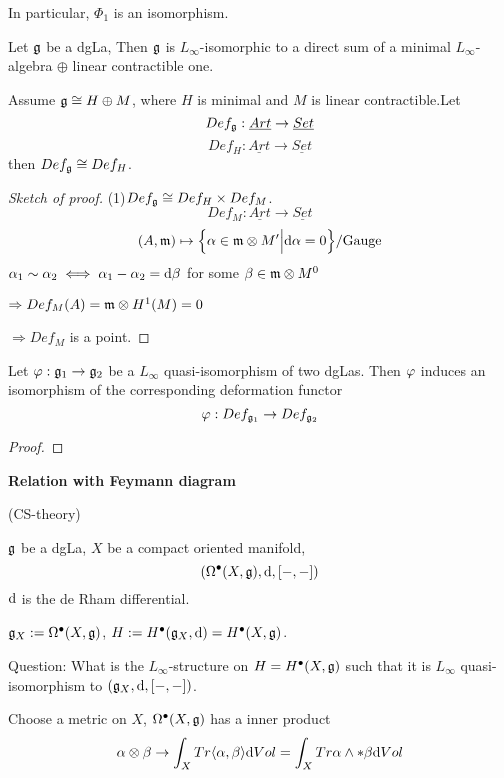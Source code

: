 In particular, $\Phi_1$ is an isomorphism.

\begin{prop}
Let $\mathfrak{g}$ be a dgLa, Then $\mathfrak{g}$ is $L_\infty$-isomorphic to
a direct sum of a minimal $L_\infty$-algebra $\oplus$
linear contractible one.
\end{prop}

\begin{cor}
Assume $\mathfrak{g}\cong H\oplus M$,
where $H$ is minimal and $M$ is linear contractible.Let
$$Def_{\mathfrak{g}}:\underline{Art}\to\underline{Set}$$
$$Def_H:\underline{Art}\to\underline{Set}$$
then $Def_{\mathfrak{g}}\cong Def_H$.
\end{cor}

\begin{proof}[Sketch of proof]
(1)$Def_{\mathfrak{g}}\cong Def_H\times Def_M$.
$$Def_M:\underline{Art}\to\underline{Set}$$
$$(A,\mathfrak{m})\mapsto\Big\{ \alpha\in\mathfrak{m}\otimes M' \Big| \mathrm{d}\alpha=0 \Big\}/\text{Gauge}$$
$\alpha_1\sim\alpha_2\iff \alpha_1-\alpha_2=\mathrm{d}\beta$ for some $\beta\in\mathfrak{m}\otimes M^0$

$\Rightarrow Def_M(A)=\mathfrak{m}\otimes H^1(M)=0$

$\Rightarrow Def_M$ is a point.
\end{proof}

\begin{prop}
Let $\varphi:\mathfrak{g}_1\to\mathfrak{g}_2$ be a $L_\infty$ quasi-isomorphism of two dgLas.
Then $\varphi$ induces an isomorphism of the corresponding deformation functor
$$\varphi:Def_{\mathfrak{g}_1}\to Def_{\mathfrak{g}_2}$$
\end{prop}

\begin{proof}
\end{proof}

\textbf{Relation with Feymann diagram}

\begin{example}(CS-theory)

$\mathfrak{g}$ be a dgLa, $X$ be a compact oriented manifold,
$$(\Omega^{\bullet}(X,\mathfrak{g}),\mathrm{d},[-,-])$$
$\mathrm{d}$ is the de Rham differential.

$\mathfrak{g}_X:=\Omega^{\bullet}(X,\mathfrak{g})$, $H:=H^{\bullet}(\mathfrak{g}_X,\mathrm{d})=H^{\bullet}(X,\mathfrak{g})$.

Question: What is the $L_\infty$-structure on $H=H^{\bullet}(X,\mathfrak{g})$
such that it is $L_\infty$ quasi-isomorphism to $(\mathfrak{g}_X,\mathrm{d},[-,-])$.
\end{example}

Choose a metric on $X$,
$\Omega^{\bullet}(X,\mathfrak{g})$ has a inner product
$$\alpha\otimes\beta\to
\int_XTr\langle \alpha,\beta \rangle\mathrm{d} Vol
=\int_XTr\alpha\wedge*\beta\mathrm{d} Vol$$


